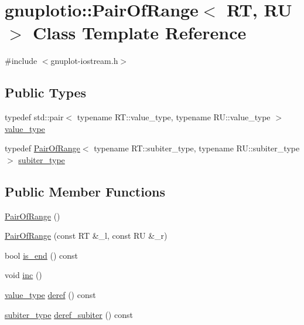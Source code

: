\hypertarget{classgnuplotio_1_1_pair_of_range}{}\section{gnuplotio\+:\+:Pair\+Of\+Range$<$ RT, RU $>$ Class Template Reference}
\label{classgnuplotio_1_1_pair_of_range}


{\ttfamily \#include $<$gnuplot-\/iostream.\+h$>$}

\subsection*{Public Types}
\begin{DoxyCompactItemize}
\item 
typedef std\+::pair$<$ typename R\+T\+::value\+\_\+type, typename R\+U\+::value\+\_\+type $>$ \hyperlink{classgnuplotio_1_1_pair_of_range_a0cc8b0cc4d9c3377c43843ed9a658eeb}{value\+\_\+type}
\item 
typedef \hyperlink{classgnuplotio_1_1_pair_of_range}{Pair\+Of\+Range}$<$ typename R\+T\+::subiter\+\_\+type, typename R\+U\+::subiter\+\_\+type $>$ \hyperlink{classgnuplotio_1_1_pair_of_range_a6a7bf8a5dd4ca0563eb71b1156d6cd9f}{subiter\+\_\+type}
\end{DoxyCompactItemize}
\subsection*{Public Member Functions}
\begin{DoxyCompactItemize}
\item 
\hyperlink{classgnuplotio_1_1_pair_of_range_a94b7cbc319a066dc9744ea1407163fb0}{Pair\+Of\+Range} ()
\item 
\hyperlink{classgnuplotio_1_1_pair_of_range_a15055ed8b1c0af8febf20f5a24d7dc05}{Pair\+Of\+Range} (const RT \&\+\_\+l, const RU \&\+\_\+r)
\item 
bool \hyperlink{classgnuplotio_1_1_pair_of_range_a1995b2f3b4c00fa9d0b4705aac4cb3ac}{is\+\_\+end} () const 
\item 
void \hyperlink{classgnuplotio_1_1_pair_of_range_adbb8ab0fb9f7245262041dd20444b96a}{inc} ()
\item 
\hyperlink{classgnuplotio_1_1_pair_of_range_a0cc8b0cc4d9c3377c43843ed9a658eeb}{value\+\_\+type} \hyperlink{classgnuplotio_1_1_pair_of_range_ab4cde941279940d87a4182706ed5d88d}{deref} () const 
\item 
\hyperlink{classgnuplotio_1_1_pair_of_range_a6a7bf8a5dd4ca0563eb71b1156d6cd9f}{subiter\+\_\+type} \hyperlink{classgnuplotio_1_1_pair_of_range_abba540b498666a006f1e31cf0cbf24c5}{deref\+\_\+subiter} () const 
\end{DoxyCompactItemize}
